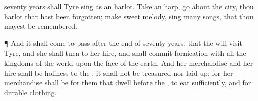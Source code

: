 {seventy
years shall
Tyre
sing as an
harlot.
Take an
harp, go
about the
city, thou
harlot that hast been
forgotten; make
sweet
melody, sing
many
songs, that thou mayest be
remembered.
\par }{\PP {}¶ And it shall come to pass after the
end of
seventy
years, that the
{} will
visit
Tyre, and she shall
turn to her
hire, and shall commit
fornication with all the
kingdoms of the
world upon the
face of the
earth.
And her
merchandise and her
hire shall be
holiness to the
{}: it shall not be
treasured nor laid
up; for her
merchandise shall be for them that
dwell
before the
{}, to
eat
sufficiently, and for
durable
clothing.

}
